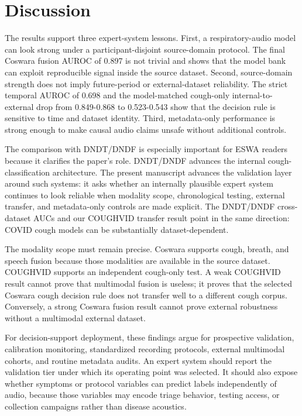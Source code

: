 \documentclass[preprint,12pt]{elsarticle}
\begin{document}
\section{Discussion}

The results support three expert-system lessons. First, a respiratory-audio model can look strong under a participant-disjoint source-domain protocol. The final Coswara fusion AUROC of 0.897 is not trivial and shows that the model bank can exploit reproducible signal inside the source dataset. Second, source-domain strength does not imply future-period or external-dataset reliability. The strict temporal AUROC of 0.698 and the model-matched cough-only internal-to-external drop from 0.849-0.868 to 0.523-0.543 show that the decision rule is sensitive to time and dataset identity. Third, metadata-only performance is strong enough to make causal audio claims unsafe without additional controls.

The comparison with DNDT/DNDF is especially important for ESWA readers because it clarifies the paper's role. DNDT/DNDF advances the internal cough-classification architecture. The present manuscript advances the validation layer around such systems: it asks whether an internally plausible expert system continues to look reliable when modality scope, chronological testing, external transfer, and metadata-only controls are made explicit. The DNDT/DNDF cross-dataset AUCs and our COUGHVID transfer result point in the same direction: COVID cough models can be substantially dataset-dependent.

The modality scope must remain precise. Coswara supports cough, breath, and speech fusion because those modalities are available in the source dataset. COUGHVID supports an independent cough-only test. A weak COUGHVID result cannot prove that multimodal fusion is useless; it proves that the selected Coswara cough decision rule does not transfer well to a different cough corpus. Conversely, a strong Coswara fusion result cannot prove external robustness without a multimodal external dataset.

For decision-support deployment, these findings argue for prospective validation, calibration monitoring, standardized recording protocols, external multimodal cohorts, and routine metadata audits. An expert system should report the validation tier under which its operating point was selected. It should also expose whether symptoms or protocol variables can predict labels independently of audio, because those variables may encode triage behavior, testing access, or collection campaigns rather than disease acoustics.
\end{document}
